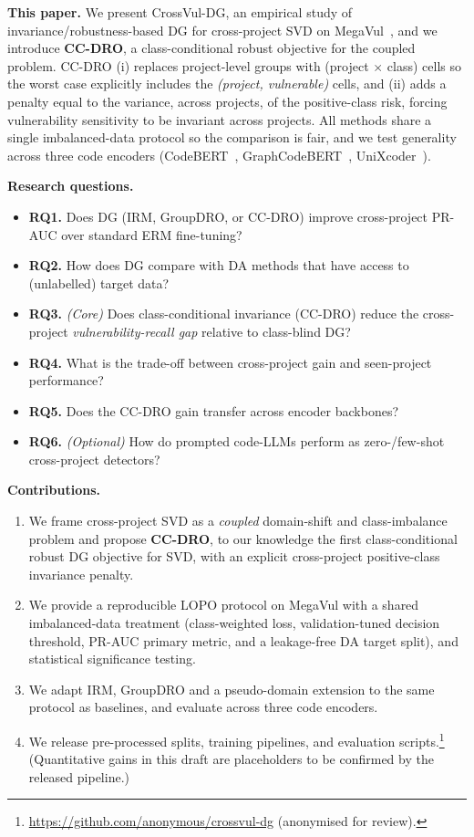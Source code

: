 \documentclass[conference]{IEEEtran}
\begin{document}
\noindent\textbf{This paper.}
We present CrossVul-DG, an empirical study of
invariance/robustness-based DG for cross-project SVD on
MegaVul~\cite{megavul}, and we introduce \textbf{CC-DRO}, a
class-conditional robust objective for the coupled problem.
CC-DRO (i) replaces project-level groups with (project
$\times$ class) cells so the worst case explicitly includes the
\emph{(project, vulnerable)} cells, and (ii) adds a penalty equal
to the variance, across projects, of the positive-class risk,
forcing vulnerability sensitivity to be invariant across projects.
All methods share a single imbalanced-data protocol so the
comparison is fair, and we test generality across three code
encoders (CodeBERT~\cite{codebert},
GraphCodeBERT~\cite{graphcodebert}, UniXcoder~\cite{unixcoder}).

\noindent\textbf{Research questions.}
\begin{itemize}
\item \textbf{RQ1.} Does DG (IRM, GroupDRO, or CC-DRO) improve
cross-project PR-AUC over standard ERM fine-tuning?
\item \textbf{RQ2.} How does DG compare with DA methods that have
access to (unlabelled) target data?
\item \textbf{RQ3.} \emph{(Core)} Does class-conditional
invariance (CC-DRO) reduce the cross-project
\emph{vulnerability-recall gap} relative to class-blind DG?
\item \textbf{RQ4.} What is the trade-off between cross-project
gain and seen-project performance?
\item \textbf{RQ5.} Does the CC-DRO gain transfer across encoder
backbones?
\item \textbf{RQ6.} \emph{(Optional)} How do prompted code-LLMs
perform as zero-/few-shot cross-project detectors?
\end{itemize}

\noindent\textbf{Contributions.}
\begin{enumerate}
\item We frame cross-project SVD as a \emph{coupled} domain-shift
and class-imbalance problem and propose \textbf{CC-DRO}, to our
knowledge the first class-conditional robust DG objective for SVD,
with an explicit cross-project positive-class invariance penalty.
\item We provide a reproducible LOPO protocol on MegaVul with a
shared imbalanced-data treatment (class-weighted loss,
validation-tuned decision threshold, PR-AUC primary metric, and a
leakage-free DA target split), and statistical significance
testing.
\item We adapt IRM, GroupDRO and a pseudo-domain extension to the
same protocol as baselines, and evaluate across three code
encoders.
\item We release pre-processed splits, training pipelines, and
evaluation scripts.\footnote{\url{https://github.com/anonymous/crossvul-dg}
(anonymised for review).} (Quantitative gains in this draft are
placeholders to be confirmed by the released pipeline.)
\end{enumerate}
\end{document}
